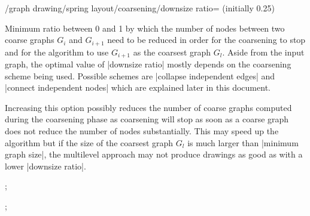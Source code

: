 \begin{key}{/graph drawing/spring layout/coarsening/downsize
  ratio= (initially 0.25)}

  Minimum ratio between 0 and 1 by which the number of nodes between 
  two coarse graphs $G_i$ and $G_{i+1}$ need to be reduced in order for 
  the coarsening to stop and for the algorithm to use $G_{i+1}$ as the 
  coarsest graph $G_l$. Aside from the input graph, the optimal value 
  of |downsize ratio| mostly depends on the coarsening scheme being
  used. Possible schemes are |collapse independent edges| and 
  |connect independent nodes| which are explained later in this
  document.

  Increasing this option possibly reduces the number of coarse
  graphs computed during the coarsening phase as coarsening will stop as
  soon as a coarse graph does not reduce the number of nodes
  substantially. This may speed up the algorithm but if the size of the 
  coarsest graph $G_l$ is much larger than |minimum graph size|, the 
  multilevel approach may not produce drawings as good as with a lower
  |downsize ratio|.
  \begin{codeexample}[width=5cm]

\tikz {};

\tikz {};
  \end{codeexample}
\end{key}

